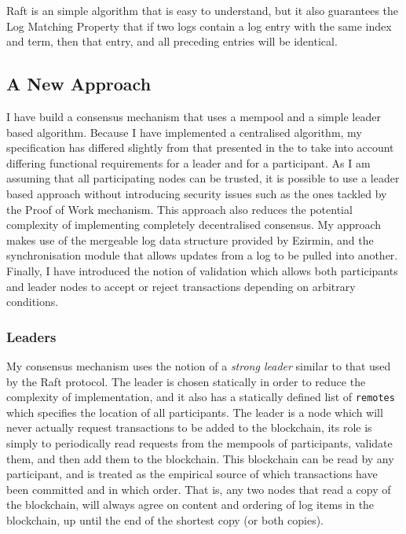 \documentclass[12pt,a4paper,twoside,openright]{report}
\begin{document}
			Raft is an simple algorithm that is easy to understand, but it also guarantees the Log Matching Property that if two logs contain a log entry with the same index and term, then that entry, and all preceding entries will be identical.

		\subsection{A New Approach}
		I have build a consensus mechanism that uses a mempool and a simple leader based algorithm. 
		Because I have implemented a centralised algorithm, my specification has differed slightly from that presented in the  to take into account differing functional requirements for a leader and for a participant.
		As I am assuming that all participating nodes can be trusted, it is possible to use a leader based approach without introducing security issues such as the ones tackled by the Proof of Work mechanism. 
		This approach also reduces the potential complexity of implementing completely decentralised consensus.
		My approach makes use of the mergeable log data structure provided by Ezirmin, and the synchronisation module that allows updates from a log to be pulled into another.
		Finally, I have introduced the notion of validation which allows both participants and leader nodes to accept or reject transactions depending on arbitrary conditions.
		
			\subsubsection*{Leaders}
			My consensus mechanism uses the notion of a \textit{strong leader} similar to that used by the Raft protocol. 
			The leader is chosen statically in order to reduce the complexity of implementation, and it also has a statically defined list of \texttt{remotes} which specifies the location of all participants.
			The leader is a node which will never actually request transactions to be added to the blockchain, its role is simply to periodically read requests from the mempools of participants, validate them, and then add them to the blockchain.
			This blockchain can be read by any participant, and is treated as the empirical source of which transactions have been committed and in which order. 
			That is, any two nodes that read a copy of the blockchain, will always agree on content and ordering of log items in the blockchain, up until the end of the shortest copy (or both copies).\\
\end{document}
